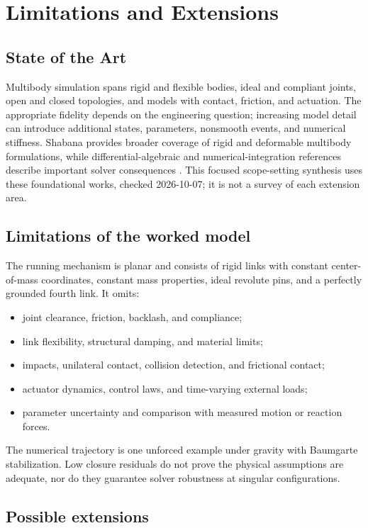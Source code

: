 \documentclass[../main.tex]{subfiles}
\begin{document}
\chapter{Limitations and Extensions}
\label{chap:limitations}

\section{State of the Art}
Multibody simulation spans rigid and flexible bodies, ideal and compliant joints, open and closed topologies, and models with contact, friction, and actuation. The appropriate fidelity depends on the engineering question; increasing model detail can introduce additional states, parameters, nonsmooth events, and numerical stiffness. Shabana provides broader coverage of rigid and deformable multibody formulations, while differential-algebraic and numerical-integration references describe important solver consequences \cite{shabana2013dynamics,ascherpetzold1998,hairerwanner1996}. This focused scope-setting synthesis uses these foundational works, checked 2026-10-07; it is not a survey of each extension area.

\section{Limitations of the worked model}
The running mechanism is planar and consists of rigid links with constant center-of-mass coordinates, constant mass properties, ideal revolute pins, and a perfectly grounded fourth link. It omits:
\begin{itemize}
 \item joint clearance, friction, backlash, and compliance;
 \item link flexibility, structural damping, and material limits;
 \item impacts, unilateral contact, collision detection, and frictional contact;
 \item actuator dynamics, control laws, and time-varying external loads;
 \item parameter uncertainty and comparison with measured motion or reaction forces.
\end{itemize}
The numerical trajectory is one unforced example under gravity with Baumgarte stabilization. Low closure residuals do not prove the physical assumptions are adequate, nor do they guarantee solver robustness at singular configurations.

\section{Possible extensions}
\end{document}
